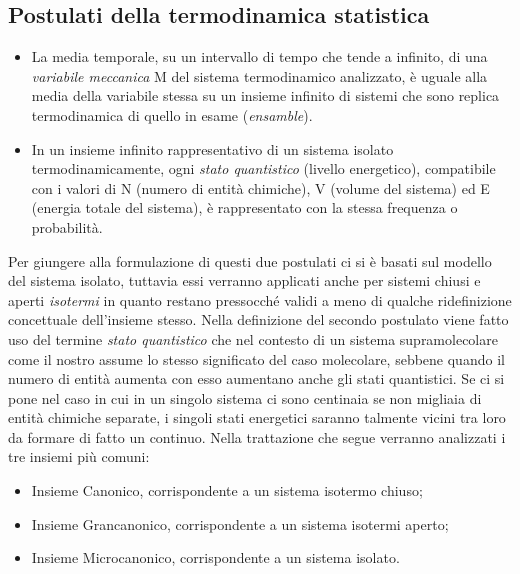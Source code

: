 \documentclass[oneside]{amsbook}
\numberwithin{section}{chapter}
\numberwithin{equation}{section}
\numberwithin{figure}{section}
\begin{document}
\subsection{Postulati della termodinamica statistica}
\begin{itemize}
\item La media temporale, su un intervallo di tempo che tende a infinito, di una \emph{variabile meccanica} M del sistema termodinamico analizzato, è uguale alla media della variabile stessa su un insieme infinito di sistemi che sono replica termodinamica di quello in esame (\emph{ensamble}).
\item In un insieme infinito rappresentativo di un sistema isolato termodinamicamente, ogni \emph{stato quantistico} (livello energetico), compatibile con i valori di N (numero di entità chimiche), V (volume del sistema) ed E (energia totale del sistema), è rappresentato con la stessa frequenza o probabilità.
\end{itemize}
Per giungere alla formulazione di questi due postulati ci si è basati sul modello del sistema isolato, tuttavia essi verranno applicati anche per sistemi chiusi e aperti \emph{isotermi} in quanto restano pressocché validi a meno di qualche ridefinizione concettuale dell'insieme stesso.
Nella definizione del secondo postulato viene fatto uso del termine \emph{stato quantistico} che nel contesto di un sistema supramolecolare come il nostro assume lo stesso significato del caso molecolare, sebbene quando il numero di entità aumenta con esso aumentano anche gli stati quantistici. Se ci si pone nel caso in cui in un singolo sistema ci sono centinaia se non migliaia di entità chimiche separate, i singoli stati energetici saranno talmente vicini tra loro da formare di fatto un continuo.
Nella trattazione che segue verranno analizzati i tre insiemi più comuni:
\begin{itemize}
\item Insieme Canonico, corrispondente a un sistema isotermo chiuso;
\item Insieme Grancanonico, corrispondente a un sistema isotermi aperto;
\item Insieme Microcanonico, corrispondente a un sistema isolato.
\end{itemize}
\end{document}
